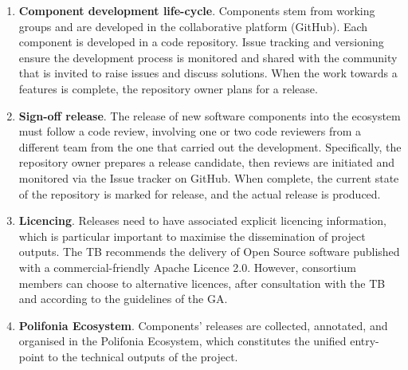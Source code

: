 \begin{enumerate}
    \item \textbf{Component development life-cycle}. Components stem from working groups and are developed in the collaborative platform (GitHub). Each component is developed in a code repository. Issue tracking and versioning ensure the development process is monitored and shared with the community that is invited to raise issues and discuss solutions. When the work towards a features is complete, the repository owner plans for a release.
    \item \textbf{Sign-off release}. The release of new software components into the ecosystem must follow a code review, involving one or two code reviewers from a different team from the one that carried out the development. Specifically, the repository owner prepares a release candidate, then reviews are initiated and monitored via the Issue tracker on GitHub. When complete, the current state of the repository is marked for release, and the actual release is produced. %
    \item \textbf{Licencing}. Releases need to have associated explicit licencing information, which is particular important to maximise the dissemination of project outputs. The TB recommends the delivery of Open Source software published with a commercial-friendly Apache Licence 2.0. However, consortium members can choose to alternative licences, after consultation with the TB and according to the guidelines of the GA.
    \item \textbf{Polifonia Ecosystem}. Components' releases are collected, annotated, and organised in the Polifonia Ecosystem, which constitutes the unified entry-point to the technical outputs of the project.
\end{enumerate}


